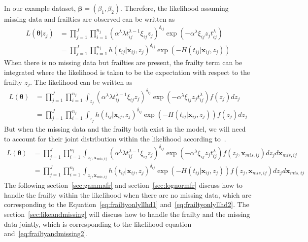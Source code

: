 \documentclass[preprint,12pt]{elsarticle}
\begin{document}
In our example dataset, $\boldsymbol{\beta}=(\beta_1, \beta_2)$. 
Therefore, the likelihood assuming missing data and frailties are observed can be written as
\begin{align}
    L(\boldsymbol{\theta}|z_j)&=\prod_{j=1}^J\prod_{i=1}^{n_j}(\alpha^{\lambda}\lambda t_{ij}^{\lambda-1}\xi_{ij}z_j)^{\delta_{ij}}\exp(-\alpha^{\lambda}\xi_{ij}z_j t_{ij}^{\lambda})\\
    &=\prod_{j=1}^J\prod_{i=1}^{n_j}h(t_{ij}|\mathbf{x}_{ij},z_j)^{\delta_{ij}}\exp(-H(t_{ij}|\mathbf{x}_{ij},z_j))
\end{align}
When there is no missing data but frailties are present, the frailty term can be integrated where the likelihood is taken to be the expectation with respect to the frailty $z_j$. 
The likelihood can be written as 
\begin{align}
    L(\boldsymbol{\theta})&=\prod_{j=1}^J\prod_{i=1}^{n_j}\int_{z_j}(\alpha^{\lambda}\lambda t_{ij}^{\lambda-1}\xi_{ij}z_j)^{\delta_{ij}}\exp(-\alpha^{\lambda}\xi_{ij}z_j t_{ij}^{\lambda})f(z_j)dz_j\label{eq:frailtyonlyllhd1}\\
    &=\prod_{j=1}^J\prod_{i=1}^{n_j}\int_{z_j}h(t_{ij}|\mathbf{x}_{ij},z_j)^{\delta_{ij}}\exp(-H(t_{ij}|\mathbf{x}_{ij},z_j))f(z_j)dz_j\label{eq:frailtyonlyllhd2}
\end{align}
But when the missing data and the frailty both exist in the model, we will need to account for their joint distribution within the likelihood according to~\citet{herring2002frailty}. 
\begin{align} 
    L(\boldsymbol{\theta})&=\prod_{j=1}^J\prod_{i=1}^{n_j}\int_{z_j,\mathbf{x}_{mis,ij}}(\alpha^{\lambda}\lambda t_{ij}^{\lambda-1}\xi_{ij}z_j)^{\delta_{ij}}\exp(-\alpha^{\lambda}\xi_{ij}z_j t_{ij}^{\lambda})f(z_j, \mathbf{x}_{mis,ij})dz_jd\mathbf{x}_{mis,ij}\label{eq:frailtyandmissing1}\\
    &=\prod_{j=1}^J\prod_{i=1}^{n_j}\int_{z_j,\mathbf{x}_{mis,ij}}h(t_{ij}|\mathbf{x}_{ij},z_j)^{\delta_{ij}}\exp(-H(t_{ij}|\mathbf{x}_{ij},z_j))f(z_j, \mathbf{x}_{mis,ij})dz_jd\mathbf{x}_{mis,ij}\label{eq:frailtyandmissing2}
\end{align}
The following section~\ref{sec:gammafr} and section~\ref{sec:lognormfr} discuss how to handle the frailty within the likelihood when there are no missing data, which are corresponding to the Equation~\ref{eq:frailtyonlyllhd1} and~\ref{eq:frailtyonlyllhd2}. 
The section~\ref{sec:likeandmissing} will discuss how to handle the frailty and the missing data jointly, which is corresponding to the likelihood equation~\label{eq:frailtyandmissing1} and~\ref{eq:frailtyandmissing2}.
\end{document}

